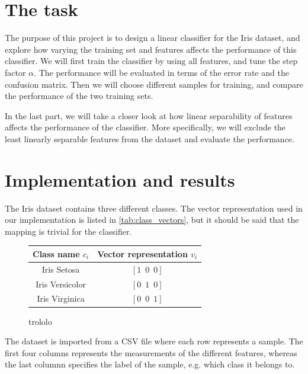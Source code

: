 \documentclass{article}
\begin{document}
\section{The task}\label{sec:task}

The purpose of this project is to design a linear classifier for the Iris dataset,
and explore how varying the training set and features affects the performance of
this classifier. We will first train the classifier by using all features, and tune
the step factor $\alpha$. The performance will be evaluated in terms of the error
rate and the confusion matrix. Then we will choose different samples for training,
and compare the performance of the two training sets.

In the last part, we will take a closer look at how linear separability of features
affects the performance of the classifier. More specifically, we will exclude the
least linearly separable features from the dataset and evaluate the performance.

\section{Implementation and results}\label{sec:implementation_and_results}

The Iris dataset contains three different classes. The vector representation used
in our implementation is listed in \autoref{tab:class_vectors}, but it should be
said that the mapping is trivial for the classifier.

\begin{figure}
    \centering
    \begin{tabular}{ | c | c | }
        \hline
        Class name $c_i$ & Vector representation $v_i$ \\
        \hline
        Iris Setosa & $[1 \enspace 0 \enspace 0]$ \\
        Iris Versicolor & $[0 \enspace 1 \enspace 0]$ \\
        Iris Virginica & $[0 \enspace 0 \enspace 1]$ \\
        \hline
    \end{tabular}
    \caption{trololo}
    \label{tab:class_vectors}
\end{figure}

The dataset is imported from a CSV file where each row represents a sample. The first four columns
represents the measurements of the different features, whereas the last columnn specifies the label of
the sample, e.g. which class it belongs to.
\end{document}
